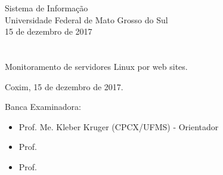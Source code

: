 \vskip 0.5cm
\begin{center}
Sistema de Informação\\
Universidade Federal de Mato Grosso do Sul\\
15 de dezembro de 2017
\end{center}
		

\chapter*{}

\begin{center}

\begin{minipage}[t]{10cm}
	\begin{center}
		\vspace{-2cm}
		{{\Large Monitoramento de servidores Linux por web sites.}}  
	\end{center}
\end{minipage}

\end{center}


\begin{flushright}
	\vspace{12cm}
	Coxim, 15 de dezembro de 2017.
	
\end{flushright}

\vspace{2cm}
Banca Examinadora:

\begin{itemize}
	\item Prof. Me. Kleber Kruger (CPCX/UFMS) - Orientador
	\item Prof. %
	\item Prof. %
\end{itemize}
